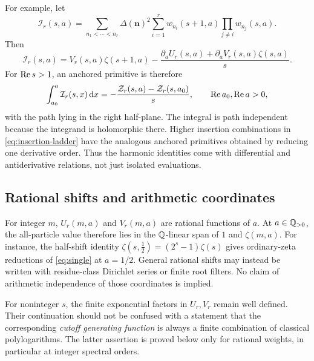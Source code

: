 For example, let
\[
 \mathcal I_r(s,a)=\sum_{n_1<\cdots<n_r}\Delta(\bm n)^2
        \sum_{i=1}^r w_{n_i}(s+1,a)\prod_{j\ne i}w_{n_j}(s,a).
\]
Then
\begin{equation}\label{eq:first-insertion}
 \mathcal I_r(s,a)=V_r(s,a)\zeta(s+1,a)
   -\frac{\partial_aU_r(s,a)+\partial_aV_r(s,a)\zeta(s,a)}s.
\end{equation}
For $\operatorname{Re} s>1$, an anchored primitive is therefore
\begin{equation}\label{eq:insertion-primitive}
 \int_{a_0}^{a}\mathcal I_r(s,x)\,\mathrm d x
       =-\frac{\mathcal Z_r(s,a)-\mathcal Z_r(s,a_0)}s,
 \qquad \operatorname{Re} a_0,\operatorname{Re} a>0,
\end{equation}
with the path lying in the right half-plane. The integral is path
independent because the integrand is holomorphic there. Higher insertion
combinations in \eqref{eq:insertion-ladder} have the analogous anchored
primitives obtained by reducing one derivative order. Thus the harmonic
identities come with differential and antiderivative relations, not just
isolated evaluations.

\subsection{Rational shifts and arithmetic coordinates}
For integer $m$, $U_r(m,a)$ and $V_r(m,a)$ are rational functions of $a$.
At $a\in\mathbb Q_{>0}$, the all-particle value therefore lies in the
$\mathbb Q$-linear span of $1$ and $\zeta(m,a)$.
For instance, the half-shift identity
$\zeta(s,\tfrac12)=(2^s-1)\zeta(s)$ gives ordinary-zeta reductions
of \eqref{eq:single} at $a=1/2$. General rational shifts may instead
be written with residue-class Dirichlet series or finite root filters.
No claim of arithmetic independence of those coordinates is implied.

For noninteger $s$, the finite exponential factors in $U_r,V_r$ remain
well defined. Their continuation should not be confused with a statement
that the corresponding \emph{cutoff generating function} is always a
finite combination of classical polylogarithms. The latter assertion is
proved below only for rational weights, in particular at integer spectral
orders.
